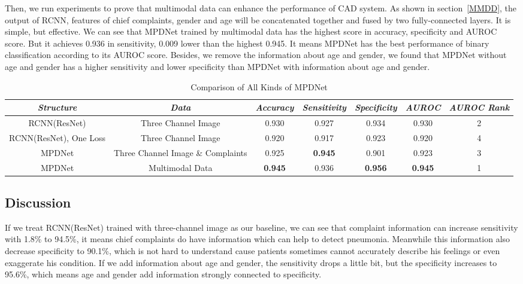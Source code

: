 \documentclass[journal]{IEEEtran}
\begin{document}
Then, we run experiments to prove that multimodal data can enhance the performance of CAD system. As shown in section~\ref{MMDD}, the output of RCNN, features of chief complaints, gender and age will be concatenated together and fused by two fully-connected layers. It is simple, but effective. We can see that MPDNet trained by multimodal data has the highest score in accuracy, specificity and AUROC score. But it achieves 0.936 in sensitivity, 0.009 lower than the highest 0.945. It means MPDNet has the best performance of binary classification according to its AUROC score. 
Besides, we remove the information about age and gender, we found that MPDNet without age and gender has a higher sensitivity and lower specificity than MPDNet with information about age and gender. 
\begin{table}[htb]
\vspace{-0cm}
\caption{Comparison of All Kinds of MPDNet}
\vspace{-0cm}
\begin{center}
\begin{tabular}{|c|c|c|c|c|c|c|}
\hline
\textbf{\textit{Structure}} & \textbf{\textit{Data}}& \textbf{\textit{Accuracy}}  & \textbf{\textit{Sensitivity}} & \textbf{\textit{Specificity}} & \textbf{\textit{AUROC}}& \textbf{\textit{AUROC Rank}}\\
\hline
RCNN(ResNet) & Three Channel Image& 0.930 & 0.927 & 0.934 & 0.930 &2\\
RCNN(ResNet), One Loss & Three Channel Image& 0.920 & 0.917 & 0.923 & 0.920 &4\\
MPDNet & Three Channel Image \& Complaints & 0.925 & {\bfseries 0.945} & 0.901 & 0.923 &3\\
MPDNet & Multimodal Data&  {\bfseries 0.945} & 0.936 & {\bfseries 0.956} & {\bfseries 0.945} &1\\
\hline
\end{tabular}
\vspace{-0cm}
\label{comparison}
\end{center}
\vspace{-0cm}
\end{table}
    


\subsection{Discussion}
\label{discuss}
If we treat RCNN(ResNet) trained with three-channel image as our baseline, we can see that complaint information can increase sensitivity with 1.8\% to 94.5\%, it means chief complaints do have information which can help to detect pneumonia. Meanwhile this information also decrease specificity to 90.1\%, which is not hard to understand cause patients sometimes cannot accurately describe his feelings or even exaggerate his condition. If we add information about age and gender, the sensitivity drops a little bit, but the specificity increases to 95.6\%, which means age and gender add information strongly connected to specificity.
\end{document}
